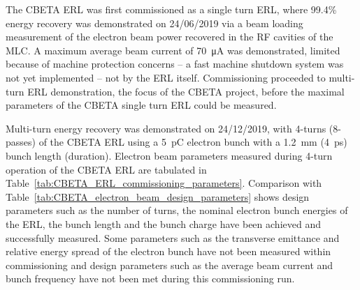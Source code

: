 \documentclass[../main.tex]{subfiles}
\begin{document}
The CBETA ERL was first commissioned as a single turn ERL, where 99.4\% energy recovery was demonstrated \cite{gulliford2021measurement} on 24/06/2019 via a beam loading measurement of the electron beam power recovered in the RF cavities of the MLC. A maximum average beam current of 70~\si{\micro\ampere} was demonstrated, limited because of machine protection concerns -- a fast machine shutdown system was not yet implemented -- not by the ERL itself. Commissioning proceeded to multi-turn ERL demonstration, the focus of the CBETA project, before the maximal parameters of the CBETA single turn ERL could be measured.

Multi-turn energy recovery was demonstrated \cite{bartnik2020cbeta} on 24/12/2019, with 4-turns (8-passes) of the CBETA ERL using a 5~\si{\pico\coulomb} electron bunch with a 1.2~\si{\milli\meter} (4~\si{\pico\second}) bunch length (duration). Electron beam parameters measured during 4-turn operation of the CBETA ERL are tabulated in Table~\ref{tab:CBETA_ERL_commissioning_parameters}. Comparison with Table~\ref{tab:CBETA_electron_beam_design_parameters} shows design parameters such as the number of turns, the nominal electron bunch energies of the ERL, the bunch length and the bunch charge have been achieved and successfully measured. Some parameters such as the transverse emittance and relative energy spread of the electron bunch have not been measured within commissioning and design parameters such as the average beam current and bunch frequency have not been met during this commissioning run.
\end{document}
